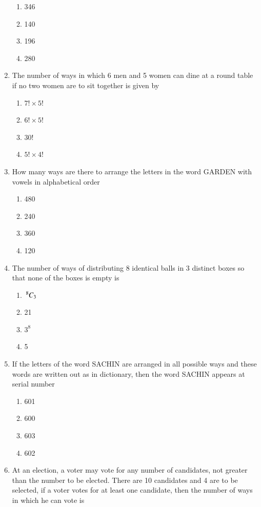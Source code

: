 \begin{enumerate}[label=\arabic*.,ref=\thesubsection.\theenumi]
\begin{enumerate}
\item 346
\item 140 
\item 196
\item 280\\
\end{enumerate}
\item The number of ways in which 6 men and 5 women can dine at a round table if no two women are to sit together is given by
\begin{enumerate}
\item $7! \times 5!$
\item $6! \times 5!$
\item 30!
\item $5! \times 4!$\\
\end{enumerate}
\item How many ways are there to arrange the letters in the word GARDEN with vowels in alphabetical order
\begin{enumerate}
\item 480
\item 240 
\item 360
\item 120\\
\end{enumerate}
\item The number of ways of distributing 8 identical balls in 3 distinct boxes so that none of the boxes is empty is 
\begin{enumerate}
\item $\,^{8}C_{3}$
\item 21
\item $3^8$
\item 5\\
\end{enumerate}
\item If the letters of the word SACHIN are arranged in all possible ways and these words are written out as in dictionary, then the word SACHIN appears at serial number
\begin{enumerate}
\item 601
\item 600 
\item 603
\item 602\\
\end{enumerate}
\item At an election, a voter may vote for any number of candidates, not greater than the number to be elected. There are 10 candidates and 4 are to be selected, if a voter votes for at least one candidate, then the number of ways in which he can vote is

\end{enumerate}
